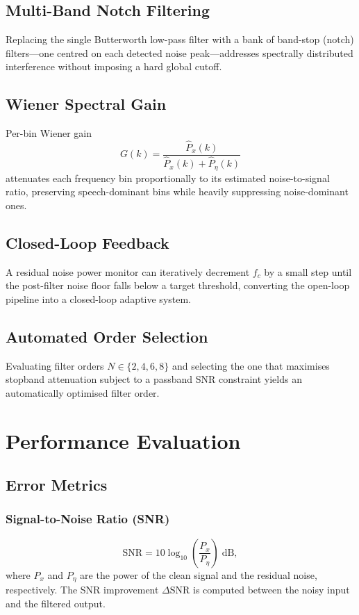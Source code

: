 \documentclass[conference]{IEEEtran}
\begin{document}
\subsection{Multi-Band Notch Filtering}
Replacing the single Butterworth low-pass filter with a bank of band-stop
(notch) filters---one centred on each detected noise peak---addresses
spectrally distributed interference without imposing a hard global cutoff.

\subsection{Wiener Spectral Gain}
Per-bin Wiener gain \cite{oppenheim2009}
\begin{equation}
  G(k) = \frac{\hat{P}_x(k)}{\hat{P}_x(k) + \hat{P}_\eta(k)}
\end{equation}
attenuates each frequency bin proportionally to its estimated noise-to-signal
ratio, preserving speech-dominant bins while heavily suppressing
noise-dominant ones.

\subsection{Closed-Loop Feedback}
A residual noise power monitor can iteratively decrement $f_c$ by a small
step until the post-filter noise floor falls below a target threshold,
converting the open-loop pipeline into a closed-loop adaptive system.

\subsection{Automated Order Selection}
Evaluating filter orders $N \in \{2, 4, 6, 8\}$ and selecting the one that
maximises stopband attenuation subject to a passband SNR constraint yields
an automatically optimised filter order.

\section{Performance Evaluation}

\subsection{Error Metrics}

\subsubsection{Signal-to-Noise Ratio (SNR)}
\begin{equation}
  \mathrm{SNR} = 10\log_{10}\!\left(\frac{P_x}{P_\eta}\right)\;\text{dB},
  \label{eq:snr}
\end{equation}
where $P_x$ and $P_\eta$ are the power of the clean signal and the residual
noise, respectively. The SNR improvement $\Delta\mathrm{SNR}$ is computed
between the noisy input and the filtered output.
\end{document}
